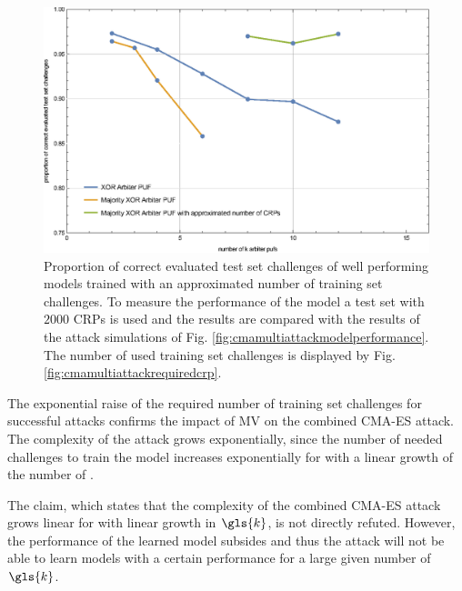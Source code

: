 \begin{figure}[ht]
\includegraphics[width=1.00\textwidth]{images/xor-cma-attack-approx.eps}
\caption[Proportion of correct evaluated test set challenges for Majority \acs{XOR} \puf models with approximated required number of training set challenges]{Proportion of correct evaluated test set challenges of well performing models trained with an approximated number of training set challenges. To measure the performance of the model a test set with $2000$ \acp{CRP} is used and the results are compared with the results of the attack simulations of Fig. \ref{fig:cmamultiattackmodelperformance}. The number of used training set challenges is displayed by Fig. \ref{fig:cmamultiattackrequiredcrp}.}
\label{fig:cmamultiattackmvmodelperformance}
\end{figure}

The exponential raise of the required number of training set challenges for successful attacks confirms the impact of \ac{MV} on the combined \ac{CMA-ES} attack.
The complexity of the attack grows exponentially, since the number of needed challenges to train the model increases exponentially for \mxpufs with a linear growth of the number of \mpufs.

The claim, which states that the complexity of the combined \ac{CMA-ES} attack grows linear for \xpufs with linear growth in $\gls{k}$, is not directly refuted.
However, the performance of the learned model subsides and thus the attack will not be able to learn models with a certain performance for a large given number of $\gls{k}$.

